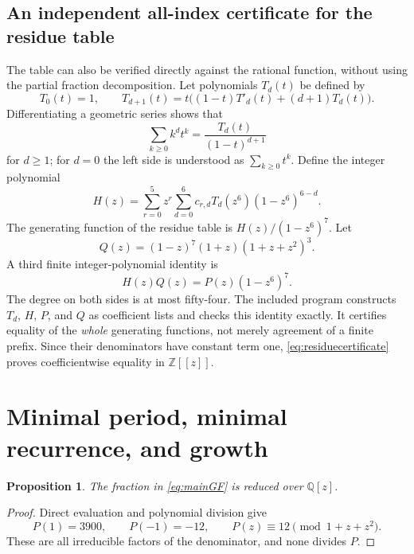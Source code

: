 \documentclass[11pt]{article}
\numberwithin{equation}{section}
\newtheorem{proposition}[theorem]{Proposition}
\theoremstyle{definition}
\newcommand{\Q}{\mathbb Q}
\newcommand{\Z}{\mathbb Z}
\begin{document}
\subsection{An independent all-index certificate for the residue table}
The table can also be verified directly against the rational function,
without using the partial fraction decomposition. Let polynomials $T_d(t)$
be defined by
\begin{equation}\label{eq:EulerT}
 T_0(t)=1,\qquad
 T_{d+1}(t)=t\bigl((1-t)T'_d(t)+(d+1)T_d(t)\bigr).
\end{equation}
Differentiating a geometric series shows that
\[
 \sum_{k\geq0}k^dt^k=\frac{T_d(t)}{(1-t)^{d+1}}
\]
for $d\geq1$; for $d=0$ the left side is understood as $\sum_{k\geq0}t^k$.
Define the integer polynomial
\begin{equation}\label{eq:Hcertificate}
 H(z)=\sum_{r=0}^5z^r\sum_{d=0}^6
 c_{r,d}T_d(z^6)(1-z^6)^{6-d}.
\end{equation}
The generating function of the residue table is $H(z)/(1-z^6)^7$.
Let
\begin{equation}\label{eq:Q}
 Q(z)=(1-z)^7(1+z)(1+z+z^2)^3.
\end{equation}
A third finite integer-polynomial identity is
\begin{equation}\label{eq:residuecertificate}
 H(z)Q(z)=P(z)(1-z^6)^7.
\end{equation}
The degree on both sides is at most fifty-four. The included program constructs
$T_d$, $H$, $P$, and $Q$ as coefficient lists and checks this identity exactly.
It certifies equality of the \emph{whole} generating functions, not merely
agreement of a finite prefix. Since their denominators have constant term one,
\eqref{eq:residuecertificate} proves coefficientwise equality in
$\Z[[z]]$.

\section{Minimal period, minimal recurrence, and growth}
\label{sec:consequences}

\begin{proposition}\label{prop:reduced}
The fraction in \eqref{eq:mainGF} is reduced over $\Q[z]$.
\end{proposition}

\begin{proof}
Direct evaluation and polynomial division give
\begin{equation}\label{eq:noncancel}
 P(1)=3900,\qquad P(-1)=-12,\qquad
 P(z)\equiv12\pmod{1+z+z^2}.
\end{equation}
These are all irreducible factors of the denominator, and none divides $P$.
\end{proof}
\end{document}
